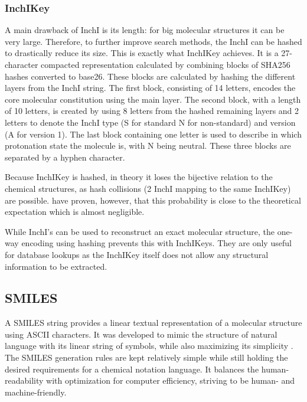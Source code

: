 \subsubsection{InchIKey}

A main drawback of InchI is its length: for big molecular structures it can be very large.
Therefore, to further improve search methods, the InchI can be hashed to drastically reduce its size.
This is exactly what InchIKey achieves.
It is a 27-character compacted representation calculated by combining blocks of SHA256 hashes converted to base26.
These blocks are calculated by hashing the different layers from the InchI string.
The first block, consisting of 14 letters, encodes the core molecular constitution using the main layer.
The second block, with a length of 10 letters, is created by using 8 letters from the hashed remaining layers and 2 letters to denote the InchI type (S for standard N for non-standard) and version (A for version 1).
The last block containing one letter is used to describe in which protonation state the molecule is, with N being neutral.
These three blocks are separated by a hyphen character.

Because InchIKey is hashed, in theory it loses the bijective relation to the chemical structures, as hash collisions (2 InchI mapping to the same InchIKey) are possible.
\textcite{pletnev2012inchikey} have proven, however, that this probability is close to the theoretical expectation which is almost negligible.

While InchI's can be used to reconstruct an exact molecular structure, the one-way encoding using hashing prevents this with InchIKeys. They are only useful for database lookups as the InchIKey itself does not allow any structural information to be extracted. 

\subsection{SMILES}

A \ac{SMILES} string provides a linear textual representation of a molecular structure using ASCII characters.
It was developed to mimic the structure of natural language with its linear string of symbols, while also maximizing its simplicity \cite{weininger1988smiles}. The SMILES generation rules are kept relatively simple while still holding the desired requirements for a chemical notation language. It balances the human-readability with optimization for computer efficiency, striving to be human- and machine-friendly.

